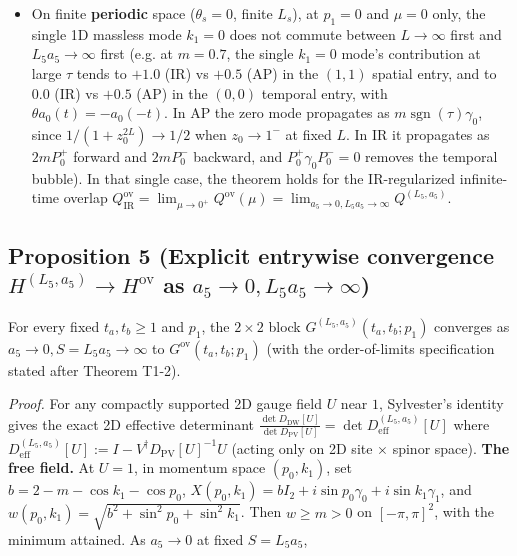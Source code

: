 \documentclass[11pt,a4paper]{article}
\begin{document}
\begin{itemize}
\begin{itemize}
\item{} The theorem does not depend on this clause. $Q^{\text{ov}}$ is defined with $L = \infty$ first (the line after the displayed inequality), and this clause only relates that object to the antiperiodic-time one.
\end{itemize}

\item{} On finite {\bfseries\boldmath periodic} space ($\theta_s = 0$, finite $L_s$), at $p_1 = 0$ and $\mu = 0$ only, the single 1D massless mode $k_1 = 0$ does not commute between $L \to \infty$ first and $L_5 a_5 \to \infty$ first (e.g. at $m = 0.7$, the single $k_1 = 0$ mode's contribution at large $\tau$ tends to $+1.0$ (IR) vs $+0.5$ (AP) in the $(1,1)$ spatial entry, and to $0.0$ (IR) vs $+0.5$ (AP) in the $(0,0)$ temporal entry, with $\theta a_0(t) = -a_0(-t)$. In AP the zero mode propagates as $m \operatorname{sgn}(\tau) \gamma_0$, since $1/(1 + z_0^{2L}) \to 1/2$ when $z_0 \to 1^-$ at fixed $L$. In IR it propagates as $2m P_0^+$ forward and $2m P_0^-$ backward, and $P_0^+ \gamma_0 P_0^- = 0$ removes the temporal bubble). In that single case, the theorem holds for the IR-regularized infinite-time overlap $Q^{\text{ov}}_{\text{IR}} = \lim_{\mu \to 0^+} Q^{\text{ov}}(\mu) = \lim_{a_5 \to 0, L_5 a_5 \to \infty} Q^{(L_5, a_5)}$.
\end{itemize}


\subsection*{Proposition 5 (Explicit entrywise convergence $H^{(L_5, a_5)} \to H^{\text{ov}}$ as $a_5 \to 0, L_5 a_5 \to \infty$)}
For every fixed $t_a, t_b \ge 1$ and $p_1$, the $2 \times 2$ block $G^{(L_5, a_5)}(t_a, t_b; p_1)$ converges as $a_5 \to 0, S = L_5 a_5 \to \infty$ to $G^{\text{ov}}(t_a, t_b; p_1)$ (with the order-of-limits specification stated after Theorem T1-2).

\emph{Proof.} For any compactly supported 2D gauge field $U$ near $1$, Sylvester's identity gives the exact 2D effective determinant $\frac{\det D_{\text{DW}}[U]}{\det D_{\text{PV}}[U]} = \det D_{\text{eff}}^{(L_5, a_5)}[U]$ where $D_{\text{eff}}^{(L_5, a_5)}[U] := I - V^\dagger D_{\text{PV}}[U]^{-1} U$ (acting only on 2D site $\times$ spinor space). {\bfseries\boldmath The free field.} At $U = 1$, in momentum space $(p_0, k_1)$, set $b = 2 - m - \cos k_1 - \cos p_0$, $X(p_0, k_1) = b I_2 + i \sin p_0 \gamma_0 + i \sin k_1 \gamma_1$, and $w(p_0, k_1) = \sqrt{b^2 + \sin^2 p_0 + \sin^2 k_1}$. Then $w \ge m > 0$ on $[-\pi, \pi]^2$, with the minimum attained. As $a_5 \to 0$ at fixed $S = L_5 a_5$,
\end{document}

